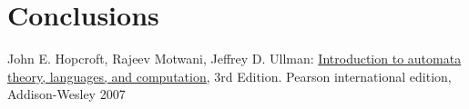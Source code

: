 \documentclass{article}
\theoremstyle{theorem}
\theoremstyle{definition}
\theoremstyle{remark}
\begin{document}
\section{Conclusions}\label{conclusions}



\begin{thebibliography}{99}
	John E. Hopcroft, Rajeev Motwani, Jeffrey D. Ullman:
\href{http://ce.sharif.edu/courses/94-95/1/ce414-2/resources/root/Text%20Books/Automata/John%20E.%20Hopcroft,%20Rajeev%20Motwani,%20Jeffrey%20D.%20Ullman-Introduction%20to%20Automata%20Theory,%20Languages,%20and%20Computations-Prentice%20Hall%20(2006).pdf}{Introduction to automata theory, languages, and computation,} 3rd Edition. Pearson international edition, Addison-Wesley 2007

\end{thebibliography}
\end{document}
